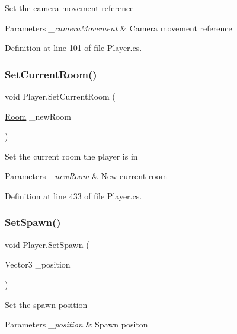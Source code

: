 Set the camera movement reference 


\begin{DoxyParams}{Parameters}
{\em \+\_\+camera\+Movement} & Camera movement reference\\
\hline
\end{DoxyParams}


Definition at line 101 of file Player.\+cs.

\mbox{\label{class_player_a24f8aeed0a7bb4dc8d2dcceea07dcaf7}} 
\subsubsection{\texorpdfstring{Set\+Current\+Room()}{SetCurrentRoom()}}
{\footnotesize\ttfamily void Player.\+Set\+Current\+Room (\begin{DoxyParamCaption}\item[{\mbox{\hyperlink{class_level_generation_1_1_room}{Room}}}]{\+\_\+new\+Room }\end{DoxyParamCaption})}



Set the current room the player is in 


\begin{DoxyParams}{Parameters}
{\em \+\_\+new\+Room} & New current room\\
\hline
\end{DoxyParams}


Definition at line 433 of file Player.\+cs.

\mbox{\label{class_player_a425c47ab72a45262765b2d60b6636911}} 
\subsubsection{\texorpdfstring{Set\+Spawn()}{SetSpawn()}}
{\footnotesize\ttfamily void Player.\+Set\+Spawn (\begin{DoxyParamCaption}\item[{Vector3}]{\+\_\+position }\end{DoxyParamCaption})}



Set the spawn position 


\begin{DoxyParams}{Parameters}
{\em \+\_\+position} & Spawn positon\\
\hline
\end{DoxyParams}


